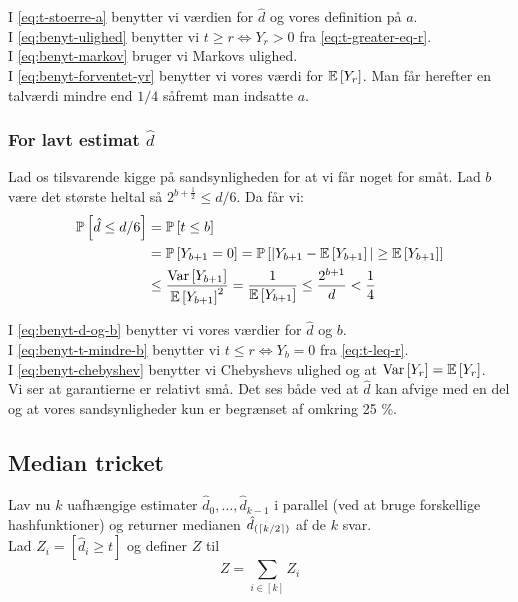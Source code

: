 I \cref{eq:t-stoerre-a} benytter vi værdien for $\hat d$ og vores definition på $a$.\\
I \cref{eq:benyt-ulighed} benytter vi $t \geq r \Longleftrightarrow Y_r > 0$ fra \cref{eq:t-greater-eq-r}.\\
I \cref{eq:benyt-markov} bruger vi Markovs ulighed.\\
I \cref{eq:benyt-forventet-yr} benytter vi vores værdi for $\mathbb{E} \left[  Y_r  \right]$. Man får herefter en talværdi mindre end $1/4$ såfremt man indsatte $a$.



\subsubsection{For lavt estimat $\hat d$}
Lad os tilsvarende kigge på sandsynligheden for at vi får noget for småt. Lad $b$ være det største heltal så $2^{b + \frac{1}{2}} \leq d/6$. Da får vi:
\begin{align}
  \mathbb{P} \left[  \hat d \leq d/6  \right]
  &= \mathbb{P} \left[  t \leq b  \right] \label{eq:benyt-d-og-b} \\
  &= \mathbb{P} \left[  Y_{b+1} = 0  \right]
  = \mathbb{P} \left[   |Y_{b+1} - \mathbb{E} \left[  Y_{b+1}  \right]| \geq \mathbb{E} \left[  Y_{b+1}  \right]   \right] \label{eq:benyt-t-mindre-b} \\
  &\leq \frac{\text{Var} \left[  Y_{b+1}  \right]}{ \mathbb{E} \left[  Y_{b+1}  \right]^2 }
  = \frac{1}{\mathbb{E} \left[  Y_{b+1}  \right]}
  \leq \frac{2^{b+1}}{d} \label{eq:benyt-chebyshev}
  < \frac{1}{4}
\end{align}

I \cref{eq:benyt-d-og-b} benytter vi vores værdier for $\hat d$ og $b$.\\
I \cref{eq:benyt-t-mindre-b} benytter vi $t \leq r \Longleftrightarrow Y_b = 0$ fra \cref{eq:t-leq-r}.\\
I \cref{eq:benyt-chebyshev} benytter vi Chebyshevs ulighed og at $\text{Var} \left[  Y_r  \right] = \mathbb{E} \left[  Y_r  \right]$.\\

Vi ser at garantierne er relativt små. Det ses både ved at $\hat d$ kan afvige med en del og at vores sandsynligheder kun er begrænset af omkring 25 \%.

\subsection{Median tricket}
Lav nu $k$ uafhængige estimater $\hat d_0, \dots, \hat d_{k-1}$ i parallel (ved at bruge forskellige hashfunktioner) og returner medianen $\hat d_{(\left\lceil k/2 \right\rceil)}$ af de $k$ svar.\\


Lad $Z_i = [\hat d_i \geq t]$ og definer $Z$ til
$$
Z = \sum_{i \in [k]} Z_i
$$


